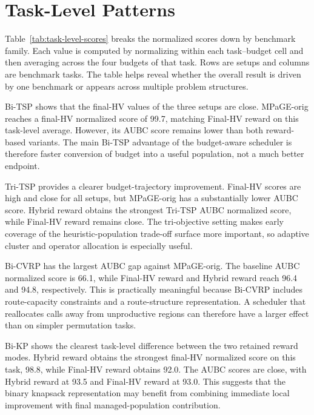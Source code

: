\documentclass[../main.tex]{subfiles}
\begin{document}
\section{Task-Level Patterns}

Table~\ref{tab:task-level-scores} breaks the normalized scores down by benchmark family. Each value is computed by normalizing within each task--budget cell and then averaging across the four budgets of that task. Rows are setups and columns are benchmark tasks. The table helps reveal whether the overall result is driven by one benchmark or appears across multiple problem structures.



Bi-TSP shows that the final-HV values of the three setups are close. MPaGE-orig reaches a final-HV normalized score of 99.7, matching Final-HV reward on this task-level average. However, its AUBC score remains lower than both reward-based variants. The main Bi-TSP advantage of the budget-aware scheduler is therefore faster conversion of budget into a useful population, not a much better endpoint.

Tri-TSP provides a clearer budget-trajectory improvement. Final-HV scores are high and close for all setups, but MPaGE-orig has a substantially lower AUBC score. Hybrid reward obtains the strongest Tri-TSP AUBC normalized score, while Final-HV reward remains close. The tri-objective setting makes early coverage of the heuristic-population trade-off surface more important, so adaptive cluster and operator allocation is especially useful.

Bi-CVRP has the largest AUBC gap against MPaGE-orig. The baseline AUBC normalized score is 66.1, while Final-HV reward and Hybrid reward reach 96.4 and 94.8, respectively. This is practically meaningful because Bi-CVRP includes route-capacity constraints and a route-structure representation. A scheduler that reallocates calls away from unproductive regions can therefore have a larger effect than on simpler permutation tasks.

Bi-KP shows the clearest task-level difference between the two retained reward modes. Hybrid reward obtains the strongest final-HV normalized score on this task, 98.8, while Final-HV reward obtains 92.0. The AUBC scores are close, with Hybrid reward at 93.5 and Final-HV reward at 93.0. This suggests that the binary knapsack representation may benefit from combining immediate local improvement with final managed-population contribution.
\end{document}
